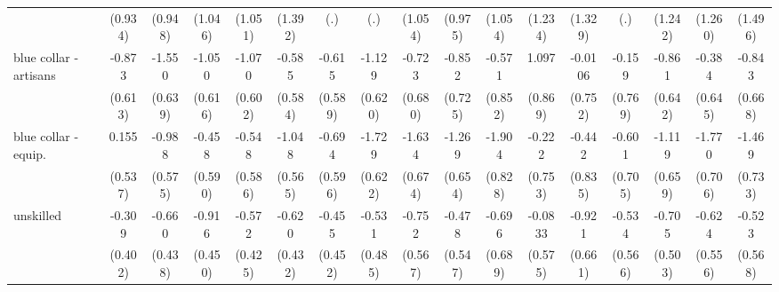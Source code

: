 {\begin{tabular}{l*{16}{c}}
                    &     (0.934)         &     (0.948)         &     (1.046)         &     (1.051)         &     (1.392)         &         (.)         &         (.)         &     (1.054)         &     (0.975)         &     (1.054)         &     (1.234)         &     (1.329)         &         (.)         &     (1.242)         &     (1.260)         &     (1.496)         \\
[1em]
blue collar - artisans&      -0.873         &      -1.550\sym{*}  &      -1.050         &      -1.070         &      -0.585         &      -0.615         &      -1.129         &      -0.723         &      -0.852         &      -0.571         &       1.097         &     -0.0106         &      -0.159         &      -0.861         &      -0.384         &      -0.843         \\
                    &     (0.613)         &     (0.639)         &     (0.616)         &     (0.602)         &     (0.584)         &     (0.589)         &     (0.620)         &     (0.680)         &     (0.725)         &     (0.852)         &     (0.869)         &     (0.752)         &     (0.769)         &     (0.642)         &     (0.645)         &     (0.668)         \\
[1em]
blue collar - equip.&       0.155         &      -0.988         &      -0.458         &      -0.548         &      -1.048         &      -0.694         &      -1.729\sym{**} &      -1.634\sym{*}  &      -1.269         &      -1.904\sym{*}  &      -0.222         &      -0.442         &      -0.601         &      -1.119         &      -1.770\sym{*}  &      -1.469\sym{*}  \\
                    &     (0.537)         &     (0.575)         &     (0.590)         &     (0.586)         &     (0.565)         &     (0.596)         &     (0.622)         &     (0.674)         &     (0.654)         &     (0.828)         &     (0.753)         &     (0.835)         &     (0.705)         &     (0.659)         &     (0.706)         &     (0.733)         \\
[1em]
unskilled           &      -0.309         &      -0.660         &      -0.916\sym{*}  &      -0.572         &      -0.620         &      -0.455         &      -0.531         &      -0.752         &      -0.478         &      -0.696         &     -0.0833         &      -0.921         &      -0.534         &      -0.705         &      -0.624         &      -0.523         \\
                    &     (0.402)         &     (0.438)         &     (0.450)         &     (0.425)         &     (0.432)         &     (0.452)         &     (0.485)         &     (0.567)         &     (0.547)         &     (0.689)         &     (0.575)         &     (0.661)         &     (0.566)         &     (0.503)         &     (0.556)         &     (0.568)         \\

\end{tabular}}
